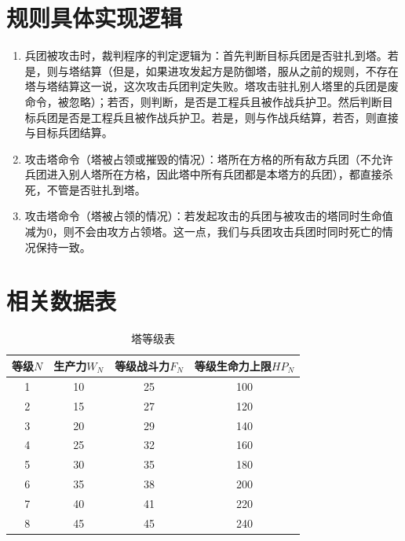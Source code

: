 \documentclass[a4paper,4pt]{article}
\begin{document}
\section{规则具体实现逻辑}\label{细则}
\begin{enumerate}[fullwidth, itemindent=2em, label=(\arabic*)]
	\item 兵团被攻击时，裁判程序的判定逻辑为：首先判断目标兵团是否驻扎到塔。若是，则与塔结算（但是，如果进攻发起方是防御塔，服从之前的规则，不存在塔与塔结算这一说，这次攻击兵团判定失败。塔攻击驻扎别人塔里的兵团是废命令，被忽略）；若否，则判断，是否是工程兵且被作战兵护卫。然后判断目标兵团是否是工程兵且被作战兵护卫。若是，则与作战兵结算，若否，则直接与目标兵团结算。
	\item 攻击塔命令（塔被占领或摧毁的情况）：塔所在方格的所有敌方兵团（不允许兵团进入别人塔所在方格，因此塔中所有兵团都是本塔方的兵团），都直接杀死，不管是否驻扎到塔。
	\item 攻击塔命令（塔被占领的情况）：若发起攻击的兵团与被攻击的塔同时生命值减为0，则不会由攻方占领塔。这一点，我们与兵团攻击兵团时同时死亡的情况保持一致。

\end{enumerate}


\section{相关数据表}
\begin{table}[htbp]
	\centering
	\caption{塔等级表}
	\label{塔等级表}%
	\begin{tabular}{c|c|c|c}
		\hline
		等级$N$ & 生产力$W_N$ & 等级战斗力$F_N$ & 等级生命力上限$HP_N$ \bigstrut \\
		\hline
		1       & 10          & 25              & 100 \bigstrut                  \\
		\hline
		2       & 15          & 27              & 120 \bigstrut                  \\
		\hline
		3       & 20          & 29              & 140 \bigstrut                  \\
		\hline
		4       & 25          & 32              & 160 \bigstrut                  \\
		\hline
		5       & 30          & 35              & 180 \bigstrut                  \\
		\hline
		6       & 35          & 38              & 200 \bigstrut                  \\
		\hline
		7       & 40          & 41              & 220 \bigstrut                  \\
		\hline
		8       & 45          & 45              & 240 \bigstrut                  \\
		\hline
	\end{tabular}%

\end{table}%
\end{document}
